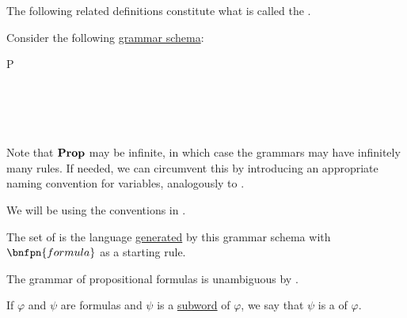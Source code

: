 \begin{definition}\label{def:propositional_syntax}
  The following related definitions constitute what is called the .

  \begin{thmenum}
     Consider the following \hyperref[def:backus_naur_form]{grammar schema}:
    \begin{bnf*}
         {P \in {}} \\
       {\circ \in \Sigma} \\
          { \bnfor} \\
      \bnfmore             {\bnfts{\( \top \)} \bnfor \bnfts{\( \bot \)} \bnfor} \\
       \\
    \end{bnf*}

    Note that \( \operatorname{\mathbf{Prop}} \) may be infinite, in which case the grammars may have infinitely many rules. If needed, we can circumvent this by introducing an appropriate naming convention for variables, analogously to .

    We will be using the conventions in .

     The set of  is the language \hyperref[def:grammar_derivation/grammar_language]{generated} by this grammar schema with \( \bnfpn{formula} \) as a starting rule.

    The grammar of propositional formulas is unambiguous by .

     If \( \varphi \) and \( \psi \) are formulas and \( \psi \) is a \hyperref[def:language/subword]{subword} of \( \varphi \), we say that \( \psi \) is a  of \( \varphi \).


\end{thmenum}
\end{definition}
